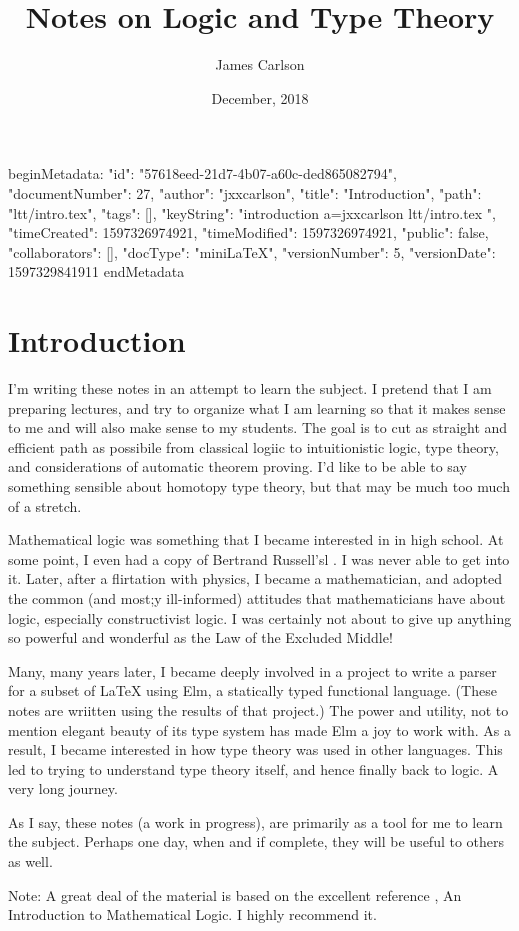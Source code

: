 beginMetadata:
{
    "id": "57618eed-21d7-4b07-a60c-ded865082794",
    "documentNumber": 27,
    "author": "jxxcarlson",
    "title": "Introduction",
    "path": "ltt/intro.tex",
    "tags": [],
    "keyString": "introduction a=jxxcarlson ltt/intro.tex ",
    "timeCreated": 1597326974921,
    "timeModified": 1597326974921,
    "public": false,
    "collaborators": [],
    "docType": "miniLaTeX",
    "versionNumber": 5,
    "versionDate": 1597329841911
}
endMetadata



\title{Notes on Logic and Type Theory}
\author{James Carlson}
\date{December, 2018}

\maketitle

\maintableofcontents



\section{Introduction}

I'm writing these notes in an attempt to learn the subject.  I pretend that I am preparing lectures, and try to organize what I am learning so that it makes sense to me and will also make sense to my students. The goal is to cut as straight and efficient path as possibile from classical logiic to intuitionistic logic, type theory, and considerations of automatic theorem proving.  I'd like to be able to say something sensible about homotopy type theory, but that may be much too much of a stretch.

Mathematical logic was something that I became interested in in high school.  At some point, I even had a copy of Bertrand Russell'sl .  I was never able to get into it.  Later, after a flirtation with physics, I became a mathematician, and adopted the common (and most;y ill-informed) attitudes that mathematicians have about logic, especially constructivist logic.  I was certainly not about to give up anything so powerful and wonderful as the Law of the Excluded Middle!

Many, many years later, I became deeply involved in a project to write a parser for a subset of LaTeX using Elm, a statically typed functional language.  (These notes are wriitten using the results of that project.) The power and utility, not to mention elegant beauty of its type system has made Elm a joy to work with.  As a result,  I became interested in how type theory was used  in other languages. This led to trying to understand type theory itself, and hence finally back to logic. A very long journey.

As I say, these notes (a work in progress), are primarily as a tool for me to learn the subject.  Perhaps one day, when and if complete, they will be useful to others as well.


Note: A great deal of the material is based on the excellent reference \cite{RH}, An Introduction to Mathematical Logic. I highly recommend it.
